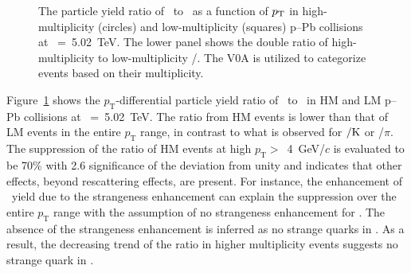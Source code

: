 \begin{figure}[!hbt]
	\centering
	\caption{The particle yield ratio of \fzero~to \kstar~as a function of $p_{\rm{T}}$ in high-multiplicity (circles) and low-multiplicity (squares) p--Pb collisions at \snn~=~5.02~TeV. The lower panel shows the double ratio of high-multiplicity to low-multiplicity \fzero/\kstar. The V0A is utilized to categorize events based on their multiplicity. }
	\label{fig:f0KsPt}
\end{figure}

Figure~\ref{fig:f0KsPt} shows the $p_{\mathrm{T}}$-differential particle yield ratio of \fzero~to \kstar~in HM and LM p--Pb collisions at \snn~=~5.02~TeV. The ratio from HM events is lower than that of LM events in the entire $p_{\mathrm{T}}$ range, in contrast to what is observed for \kstar$\rm{}/K$ or \fzero/$\pi$. The suppression of the ratio of HM events at high $p_{\mathrm{T}}>$~4~GeV/$c$ is evaluated to be 70\% with 2.6 significance of the deviation from unity and indicates that other effects, beyond rescattering effects, are present. For instance, the enhancement of \kstar~yield due to the strangeness enhancement can explain the suppression over the entire $p_{\mathrm{T}}$ range with the assumption of no strangeness enhancement for \fzero. The absence of the strangeness enhancement is inferred as no strange quarks in \fzero. As a result, the decreasing trend of the ratio in higher multiplicity events suggests no strange quark in \fzero.

